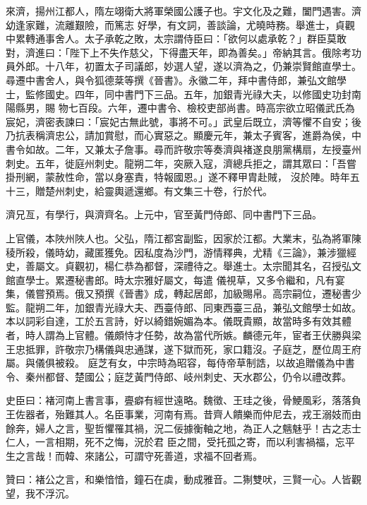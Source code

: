 \begin{pinyinscope}
 來濟，揚州江都人，隋左翊衛大將軍榮國公護子也。宇文化及之難，闔門遇害。濟幼逢家難，流離艱險，而篤志
 好學，有文詞，善談論，尤曉時務。舉進士，貞觀中累轉通事舍人。太子承乾之敗，太宗謂侍臣曰：「欲何以處承乾？」群臣莫敢對，濟進曰：「陛下上不失作慈父，下得盡天年，即為善矣。」帝納其言。俄除考功員外郎。十八年，初置太子司議郎，妙選人望，遂以濟為之，仍兼崇賢館直學士。尋遷中書舍人，與令狐德棻等撰《晉書》。永徽二年，拜中書侍郎，兼弘文館學士，監修國史。四年，同中書門下三品。五年，加銀青光祿大夫，以修國史功封南陽縣男，賜
 物七百段。六年，遷中書令、檢校吏部尚書。時高宗欲立昭儀武氏為宸妃，濟密表諫曰：「宸妃古無此號，事將不可。」武皇后既立，濟等懼不自安；後乃抗表稱濟忠公，請加賞慰，而心實惡之。顯慶元年，兼太子賓客，進爵為侯，中書令如故。二年，又兼太子詹事。尋而許敬宗等奏濟與褚遂良朋黨構扇，左授臺州刺史。五年，徙庭州刺史。龍朔二年，突厥入寇，濟總兵拒之，謂其眾曰：「吾嘗掛刑網，蒙赦性命，當以身塞責，特報國恩。」遂不釋甲胄赴賊，
 沒於陣。時年五十三，贈楚州刺史，給靈輿遞還鄉。有文集三十卷，行於代。



 濟兄亙，有學行，與濟齊名。上元中，官至黃門侍郎、同中書門下三品。



 上官儀，本陜州陜人也。父弘，隋江都宮副監，因家於江都。大業末，弘為將軍陳稜所殺，儀時幼，藏匿獲免。因私度為沙門，游情釋典，尤精《三論》，兼涉獵經史，善屬文。貞觀初，楊仁恭為都督，深禮待之。舉進士。太宗聞其名，召授弘文館直學士。累遷秘書郎。時太宗雅好屬文，每遣
 儀視草，又多令繼和，凡有宴集，儀嘗預焉。俄又預撰《晉書》成，轉起居郎，加級賜帛。高宗嗣位，遷秘書少監。龍朔二年，加銀青光祿大夫、西臺侍郎、同東西臺三品，兼弘文館學士如故。本以詞彩自達，工於五言詩，好以綺錯婉媚為本。儀既貴顯，故當時多有效其體者，時人謂為上官體。儀頗恃才任勢，故為當代所嫉。麟德元年，宦者王伏勝與梁王忠抵罪，許敬宗乃構儀與忠通謀，遂下獄而死，家口籍沒。子庭芝，歷位周王府屬。與儀俱被殺。
 庭芝有女，中宗時為昭容，每侍帝草制誥，以故追贈儀為中書令、秦州都督、楚國公；庭芝黃門侍郎、岐州刺史、天水郡公，仍令以禮改葬。



 史臣曰：褚河南上書言事，亹癖有經世遠略。魏徵、王珪之後，骨鯁風彩，落落負王佐器者，殆難其人。名臣事業，河南有焉。昔齊人饋樂而仲尼去，戎王溺妓而由餘奔，婦人之言，聖哲懼罹其禍，況二佞據衡軸之地，為正人之魑魅乎！古之志士仁人，一言相期，死不之悔，況於君
 臣之間，受托孤之寄，而以利害禍福，忘平生之言哉！而韓、來諸公，可謂守死善道，求福不回者焉。



 贊曰：褚公之言，和樂愔愔，鐘石在虡，動成雅音。二猘雙吠，三賢一心。人皆觀望，我不浮沉。



\end{pinyinscope}